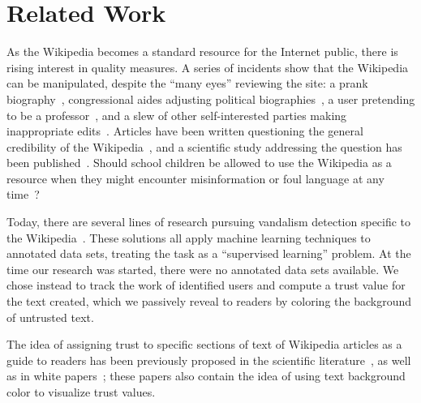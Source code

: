 \section{Related Work}

As the Wikipedia becomes a standard resource for the Internet
public, there is rising interest in quality measures.
A series of incidents show that the Wikipedia can be manipulated,
despite the ``many eyes'' reviewing the site:
a prank biography~\cite{Seigenthaler05,NewYorkTimes05a,NewYorkTimes05b},
congressional aides adjusting political
biographies~\cite{Lehmann2006,NewZelandHerald06,Davis2006},
a user pretending to be a professor~\cite{BBC07},
and a slew of other self-interested parties making
inappropriate edits~\cite{Wired07,Wikiscanner07,Noguchi2008}.
Articles have been written questioning the
general credibility of the Wikipedia~\cite{Stross2006,Schiff2006},
and a scientific study addressing the question
has been published~\cite{Giles2005}.
Should school children be allowed to use the Wikipedia as
a resource when they might encounter misinformation or foul
language at any time~\cite{Gralla2007,Olanoff2007}?

Today, there are several lines of research pursuing
vandalism detection specific to the Wikipedia~\cite{Potthast2010b}.
These solutions all apply machine learning techniques
to annotated data sets, treating the task as a
``supervised learning'' problem.
At the time our research was started, there were no annotated
data sets available.
We chose instead to track the work of identified users and compute a
trust value for the text created, which we passively reveal to readers
by coloring the background of untrusted text.

The idea of assigning trust to specific sections of text of Wikipedia
articles as a guide to readers has been previously proposed in the scientific
literature~\cite{WikiMTWtrust06,Cross2006,McGuinness06}, as well as in white
papers~\cite{King2007}; these papers also contain
the idea of using text background color to visualize trust values.



